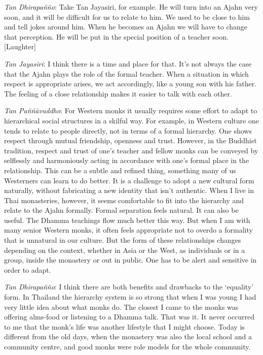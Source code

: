 \emph{Tan Dhirapañño}‎: Take Tan Jayasiri, for example. He will turn
into an Ajahn very soon, and it will be difficult for us to relate to
him. We used to be close to him and tell jokes around him. When he
becomes an Ajahn we will have to change that perception. He will be put
in the special position of a teacher soon. {[}Laughter{]}

\emph{Tan Jayasiri}: I think there is a time and place for that. It's
not always the case that the Ajahn plays the role of the formal teacher.
When a situation in which respect is appropriate arises, we act
accordingly, like a young son with his father. The feeling of a close
relationship makes it easier to talk with each other.

\emph{Tan Paññāvuddho}‎: For Western monks it usually requires some
effort to adapt to hierarchical social structures in a skilful way. For
example, in Western culture one tends to relate to people directly, not
in terms of a formal hierarchy. One shows respect through mutual
friendship, openness and trust. However, in the Buddhist tradition,
respect and trust of one's teacher and fellow monks can be conveyed by
selflessly and harmoniously acting in accordance with one's formal place
in the relationship. This can be a subtle and refined thing, something
many of us Westerners can learn to do better. It is a challenge to adopt
a new cultural form naturally, without fabricating a new identity that
isn't authentic. When I live in Thai monasteries, however, it seems
comfortable to fit into the hierarchy and relate to the Ajahn formally.
Formal separation feels natural. It can also be useful. The Dhamma
teachings flow much better this way. But when I am with many senior
Western monks, it often feels appropriate not to overdo a formality that
is unnatural in our culture. But the form of these relationships changes
depending on the context, whether in Asia or the West, as individuals or
in a group, inside the monastery or out in public. One has to be alert
and sensitive in order to adapt.

\emph{Tan Dhirapañño}‎: I think there are both benefits and drawbacks to
the `equality' form. In Thailand the hierarchy system is so strong that
when I was young I had very little idea about what monks do. The closest
I came to the monks was offering alms-food or listening to a Dhamma
talk. That was it. It never occurred to me that the monk's life was
another lifestyle that I might choose. Today is different from the old
days, when the monastery was also the local school and a community
centre, and good monks were role models for the whole community.

